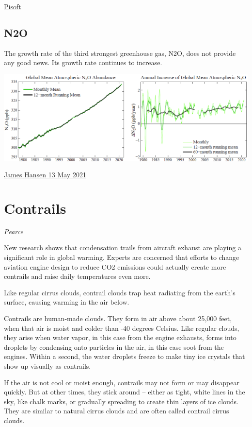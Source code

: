 \documentclass[
]{book}
\begin{document}
\href{https://iopscience.iop.org/article/10.1088/1748-9326/abfe2b}{Pisoft}

\hypertarget{n2o}{%
\subsection{N2O}\label{n2o}}

The growth rate of the third strongest greenhouse gas, N2O, does not provide any good news. Its growth rate continues to increase.

\includegraphics{fig/N2O_Abundance.png}

\href{https://mailchi.mp/caa/the-world-has-cooled-off-whats-the-significance}{James Hansen 13 May 2021}

\hypertarget{contrails}{%
\section{Contrails}\label{contrails}}

\emph{Pearce}

New research shows that condensation trails from aircraft exhaust are playing a significant role in global warming. Experts are concerned that efforts to change aviation engine design to reduce CO2 emissions could actually create more contrails and raise daily temperatures even more.

Like regular cirrus clouds, contrail clouds trap heat radiating from the earth's surface, causing warming in the air below.

Contrails are human-made clouds. They form in air above about 25,000 feet, when that air is moist and colder than -40 degrees Celsius. Like regular clouds, they arise when water vapor, in this case from the engine exhausts, forms into droplets by condensing onto particles in the air, in this case soot from the engines. Within a second, the water droplets freeze to make tiny ice crystals that show up visually as contrails.

If the air is not cool or moist enough, contrails may not form or may disappear quickly. But at other times, they stick around -- either as tight, white lines in the sky, like chalk marks, or gradually spreading to create thin layers of ice clouds. They are similar to natural cirrus clouds and are often called contrail cirrus clouds.
\end{document}
